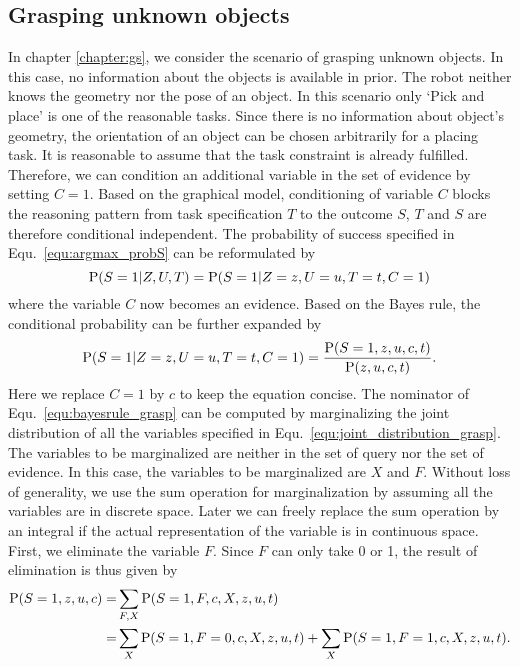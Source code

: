   
\subsection{Grasping unknown objects} 
In chapter \ref{chapter:gs}, we consider the scenario of grasping unknown objects. In this case, no information about the objects is available in prior. The robot neither knows the geometry nor the pose of an object. In this scenario only `Pick and place' is one of the reasonable tasks. Since there is no information about object's geometry, the orientation of an object can be chosen arbitrarily for a placing task. It is reasonable to assume that the task constraint is already fulfilled. Therefore, we can condition an additional variable in the set of evidence by setting $C = 1$. Based on the graphical model, conditioning of variable $C$ blocks the reasoning pattern from task specification $T$ to the outcome $S$, $T$ and $S$ are therefore conditional independent. The probability of success specified in Equ.~\ref{equ:argmax_probS} can be reformulated by 
\begin{equation}
\operatorname*{\text{P}} (S = 1| Z, U ,T) = \operatorname*{\text{P}}(S = 1|Z=z,U=u,T=t, C=1)
\end{equation}
where the variable $C$ now becomes an evidence. Based on the Bayes rule, the conditional probability can be further expanded by
\begin{equation}
 \operatorname*{\text{P}}(S = 1|Z=z,U=u,T=t,C=1) = \frac{ \operatorname*{\text{P}}(S = 1,z,u,c,t)}{\operatorname*{\text{P}}(z,u,c,t)}.
 \label{equ:bayesrule_grasp}
\end{equation}
Here we replace $C=1$ by $c$ to keep the equation concise. The nominator of Equ.~\ref{equ:bayesrule_grasp} can be computed by marginalizing the joint distribution of all the variables specified in Equ.~\ref{equ:joint_distribution_grasp}. The variables to be marginalized are neither in the set of query nor  the set of evidence. In this case, the variables to be marginalized are $X$ and $F$. Without loss of generality, we use the sum operation for marginalization by assuming all the variables are in discrete space. Later we can freely replace the sum operation by an integral if the actual representation of the variable is in continuous space. First, we eliminate the variable $F$. Since $F$ can only take 0 or 1, the result of elimination is thus given by 
\begin{equation}
\begin{split}
\operatorname*{\text{P}}(S = 1,z,u,c) =& \sum_{F,X} \operatorname*{\text{P}} (S=1,F,c,X,z,u,t)  \\
                 =& \sum_{X}  \operatorname*{\text{P}} (S=1, F = 0, c ,X, z,u,t) + \sum_{X}  \operatorname*{\text{P}} (S=1,F=1,c,X,z,u,t).                  
\end{split}
\label{equ:elimination}
\end{equation}
